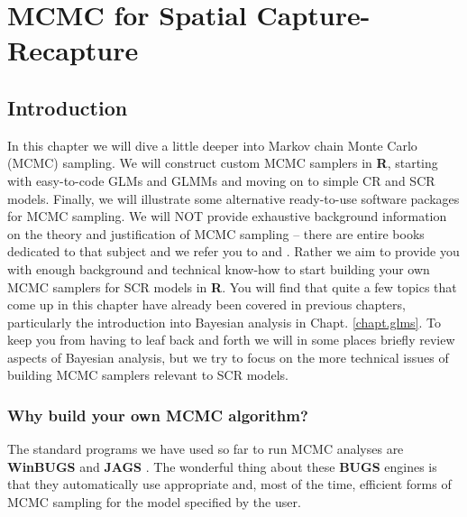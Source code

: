\chapter{
MCMC for Spatial Capture-Recapture
}
\label{chapt.mcmc}


\vspace{.3in}

\section{Introduction}
In this chapter we will dive a little deeper into Markov chain Monte
Carlo (MCMC) sampling. We will construct custom MCMC samplers in {\bf R},
starting with easy-to-code GLMs and GLMMs and moving on to simple CR and SCR
models. Finally, we will illustrate some alternative
ready-to-use software packages for MCMC sampling. We will NOT provide
exhaustive background information on the theory and justification of
MCMC sampling -- there are entire books dedicated to that subject and
we refer you to \citet{robert_casella:2004} and
\citet{robert_casella:2010}. Rather we aim to provide you with enough
background and technical know-how to start building your own MCMC
samplers for SCR models in {\bf R}. You will find that quite a few topics that come up 
in this chapter have already been covered in previous chapters, particularly the introduction
into Bayesian analysis in Chapt. \ref{chapt.glms}. To keep you from having to leaf back and forth
we will in some places briefly review aspects of Bayesian analysis, but we try to focus on the more 
technical issues of building MCMC samplers relevant to SCR models. 



\subsection{Why build your own MCMC algorithm?}

The standard programs we have used so far to run MCMC analyses are
{\bf WinBUGS} \citep{gilks_etal:1994} and {\bf JAGS}
\citep{plummer:2003}. The wonderful thing about these {\bf BUGS}
engines
is that they automatically use  appropriate and, most of the time,
efficient forms
of MCMC sampling for the model specified by the user.

